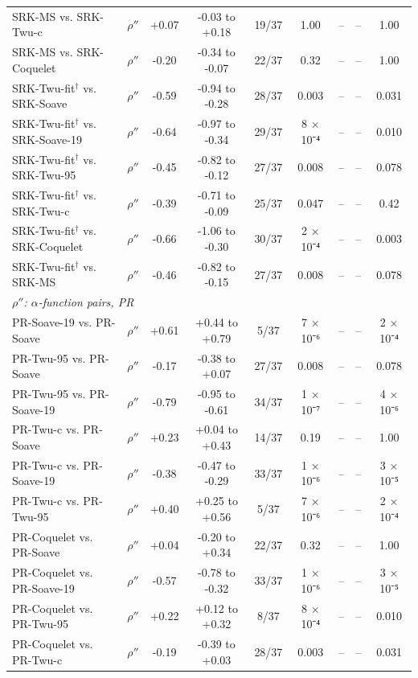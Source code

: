 \begin{table}[H]
\begin{tabular}{llccccccc}
SRK-MS vs. SRK-Twu-c & $\rho''$ & +0.07 & -0.03 to +0.18 & 19/37 & 1.00 & -- & -- & 1.00 \\
SRK-MS vs. SRK-Coquelet & $\rho''$ & -0.20 & -0.34 to -0.07 & 22/37 & 0.32 & -- & -- & 1.00 \\
SRK-Twu-fit$^{\dagger}$ vs. SRK-Soave & $\rho''$ & -0.59 & -0.94 to -0.28 & 28/37 & 0.003 & -- & -- & 0.031 \\
SRK-Twu-fit$^{\dagger}$ vs. SRK-Soave-19 & $\rho''$ & -0.64 & -0.97 to -0.34 & 29/37 & 8 × 10⁻⁴ & -- & -- & 0.010 \\
SRK-Twu-fit$^{\dagger}$ vs. SRK-Twu-95 & $\rho''$ & -0.45 & -0.82 to -0.12 & 27/37 & 0.008 & -- & -- & 0.078 \\
SRK-Twu-fit$^{\dagger}$ vs. SRK-Twu-c & $\rho''$ & -0.39 & -0.71 to -0.09 & 25/37 & 0.047 & -- & -- & 0.42 \\
SRK-Twu-fit$^{\dagger}$ vs. SRK-Coquelet & $\rho''$ & -0.66 & -1.06 to -0.30 & 30/37 & 2 × 10⁻⁴ & -- & -- & 0.003 \\
SRK-Twu-fit$^{\dagger}$ vs. SRK-MS & $\rho''$ & -0.46 & -0.82 to -0.15 & 27/37 & 0.008 & -- & -- & 0.078 \\
\multicolumn{9}{l}{\emph{$\rho''$: $\alpha$-function pairs, PR}} \\
PR-Soave-19 vs. PR-Soave & $\rho''$ & +0.61 & +0.44 to +0.79 & 5/37 & 7 × 10⁻⁶ & -- & -- & 2 × 10⁻⁴ \\
PR-Twu-95 vs. PR-Soave & $\rho''$ & -0.17 & -0.38 to +0.07 & 27/37 & 0.008 & -- & -- & 0.078 \\
PR-Twu-95 vs. PR-Soave-19 & $\rho''$ & -0.79 & -0.95 to -0.61 & 34/37 & 1 × 10⁻⁷ & -- & -- & 4 × 10⁻⁶ \\
PR-Twu-c vs. PR-Soave & $\rho''$ & +0.23 & +0.04 to +0.43 & 14/37 & 0.19 & -- & -- & 1.00 \\
PR-Twu-c vs. PR-Soave-19 & $\rho''$ & -0.38 & -0.47 to -0.29 & 33/37 & 1 × 10⁻⁶ & -- & -- & 3 × 10⁻⁵ \\
PR-Twu-c vs. PR-Twu-95 & $\rho''$ & +0.40 & +0.25 to +0.56 & 5/37 & 7 × 10⁻⁶ & -- & -- & 2 × 10⁻⁴ \\
PR-Coquelet vs. PR-Soave & $\rho''$ & +0.04 & -0.20 to +0.34 & 22/37 & 0.32 & -- & -- & 1.00 \\
PR-Coquelet vs. PR-Soave-19 & $\rho''$ & -0.57 & -0.78 to -0.32 & 33/37 & 1 × 10⁻⁶ & -- & -- & 3 × 10⁻⁵ \\
PR-Coquelet vs. PR-Twu-95 & $\rho''$ & +0.22 & +0.12 to +0.32 & 8/37 & 8 × 10⁻⁴ & -- & -- & 0.010 \\
PR-Coquelet vs. PR-Twu-c & $\rho''$ & -0.19 & -0.39 to +0.03 & 28/37 & 0.003 & -- & -- & 0.031 \\

\end{tabular}
\end{table}
